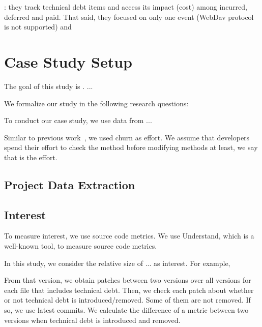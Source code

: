 \documentclass[conference]{IEEEtran}
\begin{document}
\cite{Guo2011ICSM}: they track technical debt items and access its impact (cost) among incurred, deferred and paid. That said, they focused on only one event (WebDav protocol is not supported) and 


\section{Case Study Setup}
The goal of this study is .
...

We formalize our study in the following research questions:


To conduct our case study, we use data from ...


Similar to previous work~\cite{Kamei2010ICSM,Kamei2013TSE}, we used churn as effort. We assume that developers spend their effort to check the method before modifying methods at least, we say that is the effort.

\subsection{Project Data Extraction}

\para{}

\subsection{Interest}
To measure interest, we use source code metrics. We use Understand, which is a well-known tool, to measure source code metrics. 


In this study, we consider the relative size of ... as interest. For example, 

From that version, we obtain patches between two versions over all versions for each file that includes technical debt. Then, we check each patch about whether or not technical debt is introduced/removed. Some of them are not removed. If so, we use latest commits. We calculate the difference of a metric between two versions when technical debt is introduced and removed.
\end{document}
